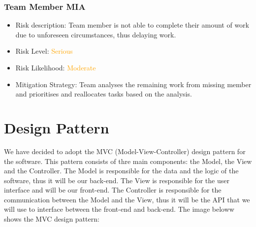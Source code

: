 \documentclass{article}
\begin{document}
\subsubsection{Team Member MIA}
\begin{itemize}
    \item Risk description: Team member is not able to complete their amount of work due to unforeseen circumstances, thus delaying work. 
    \item Risk Level: \textcolor{orange}{Serious}
    \item Risk Likelihood: \textcolor{orange}{Moderate}
    \item Mitigation Strategy: Team analyses the remaining work from missing member and prioritises and reallocates tasks based on the analysis. 
\end{itemize}

\section{Design Pattern}
We have decided to adopt the MVC (Model-View-Controller) design pattern for the software. This pattern consists of thre main components: the Model, the View and the Controller.
The Model is responsible for the data and the logic of the software, thus it will be our back-end. The View is responsible for the user interface and will be our front-end. The Controller is responsible for the communication between the Model and the View, 
thus it will be the API that we will use to interface between the front-end and back-end. The image beloww shows the MVC design pattern:
\end{document}
